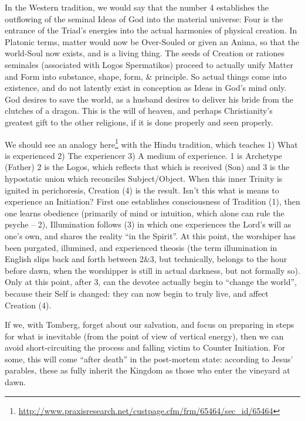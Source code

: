 In the Western tradition, we would say that the number 4 establishes the outflowing of the seminal Ideas of God into the material universe: Four is the entrance of the Triad's energies into the actual harmonies of physical creation. In Platonic terms, matter would now be Over-Souled or given an Anima, so that the world-Soul now exists, and is a living thing. The seeds of Creation or rationes seminales (associated with Logos Spermatikos) proceed to actually unify Matter and Form into substance, shape, form, \& principle. So actual things come into existence, and do not latently exist in conception as Ideas in God's mind only. God desires to save the world, as a husband desires to deliver his bride from the clutches of a dragon. This is the will of heaven, and perhaps Christianity's greatest gift to the other religions, if it is done properly and seen properly.

We should see an analogy here\footnote{\url{http://www.praxisresearch.net/custpage.cfm/frm/65464/sec\_id/65464}} with the Hindu tradition, which teaches 1) What is experienced 2) The experiencer 3) A medium of experience. 1 is Archetype (Father) 2 is the Logos, which reflects that which is received (Son) and 3 is the hypostatic union which reconciles Subject/Object. When this inner Trinity is ignited in perichoresis, Creation (4) is the result. Isn't this what is means to experience an Initiation? First one establishes consciousness of Tradition (1), then one learns obedience (primarily of mind or intuition, which alone can rule the psyche -- 2), Illumination follows (3) in which one experiences the Lord's will as one's own, and shares the reality ``in the Spirit''. At this point, the worshiper has been purgated, illumined, and experienced theosis (the term illumination in English slips back and forth between 2\&3, but technically, belongs to the hour before dawn, when the worshipper is still in actual darkness, but not formally so). Only at this point, after 3, can the devotee actually begin to ``change the world'', because their Self is changed: they can now begin to truly live, and affect Creation (4).

If we, with Tomberg, forget about our salvation, and focus on preparing in steps for what is inevitable (from the point of view of vertical energy), then we can avoid short-circuiting the process and falling victim to Counter Initiation. For some, this will come ``after death'' in the post-mortem state: according to Jesus' parables, these as fully inherit the Kingdom as those who enter the vineyard at dawn.

